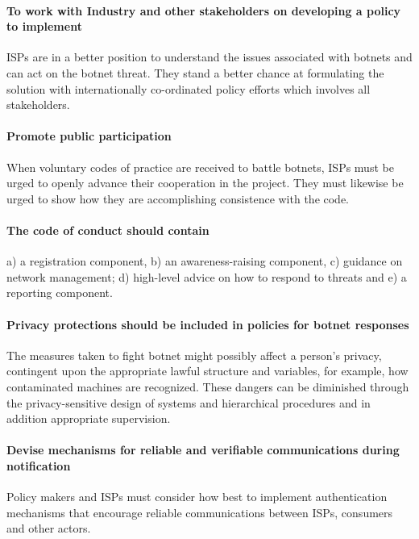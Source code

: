 


\paragraph{To work with Industry and other stakeholders on developing a policy to implement}

ISPs are in a better position to understand the issues associated with botnets and can act on the botnet threat. They stand a better chance at formulating the solution with internationally co-ordinated policy efforts which involves all stakeholders.

\paragraph{Promote public participation}

When voluntary codes of practice are received to battle botnets, ISPs must be urged to openly advance their cooperation in the project. They must likewise be urged to show how they are accomplishing consistence with the code.


\paragraph{The code of conduct should contain}

a) a registration component, b) an awareness-raising component, c) guidance on network management; d) high-level advice on how to respond to threats and e) a reporting component. 

\paragraph{Privacy protections should be included in policies for botnet responses}

The measures taken to fight botnet might possibly affect a person’s privacy, contingent upon the appropriate lawful structure and variables, for example, how contaminated machines are recognized. These dangers can be diminished through the privacy-sensitive design of systems and hierarchical procedures and in addition appropriate supervision.

\paragraph{Devise mechanisms for reliable and verifiable communications during notification}

Policy makers and ISPs must consider how best to implement authentication mechanisms that encourage reliable communications between ISPs, consumers and other actors. 

